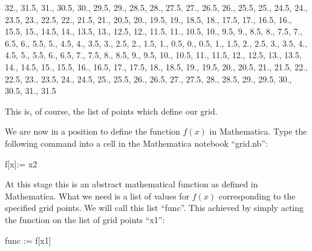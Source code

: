 \documentclass[letterpaper,10pt,english]{sphinxmanual}
\begin{document}
\begin{sphinxVerbatim}[commandchars=\\\{\}]
\PYGZob{}\PYGZhy{}32., \PYGZhy{}31.5, \PYGZhy{}31., \PYGZhy{}30.5, \PYGZhy{}30., \PYGZhy{}29.5, \PYGZhy{}29., \PYGZhy{}28.5, \PYGZhy{}28., \PYGZhy{}27.5,
\PYGZhy{}27., \PYGZhy{}26.5, \PYGZhy{}26., \PYGZhy{}25.5, \PYGZhy{}25., \PYGZhy{}24.5, \PYGZhy{}24., \PYGZhy{}23.5, \PYGZhy{}23., \PYGZhy{}22.5,
\PYGZhy{}22., \PYGZhy{}21.5, \PYGZhy{}21., \PYGZhy{}20.5, \PYGZhy{}20., \PYGZhy{}19.5, \PYGZhy{}19., \PYGZhy{}18.5, \PYGZhy{}18., \PYGZhy{}17.5,
\PYGZhy{}17., \PYGZhy{}16.5, \PYGZhy{}16., \PYGZhy{}15.5, \PYGZhy{}15., \PYGZhy{}14.5, \PYGZhy{}14., \PYGZhy{}13.5, \PYGZhy{}13., \PYGZhy{}12.5,
\PYGZhy{}12., \PYGZhy{}11.5, \PYGZhy{}11., \PYGZhy{}10.5, \PYGZhy{}10., \PYGZhy{}9.5, \PYGZhy{}9., \PYGZhy{}8.5, \PYGZhy{}8., \PYGZhy{}7.5, \PYGZhy{}7.,
\PYGZhy{}6.5, \PYGZhy{}6., \PYGZhy{}5.5, \PYGZhy{}5., \PYGZhy{}4.5, \PYGZhy{}4., \PYGZhy{}3.5, \PYGZhy{}3., \PYGZhy{}2.5, \PYGZhy{}2., \PYGZhy{}1.5, \PYGZhy{}1.,
\PYGZhy{}0.5, 0., 0.5, 1., 1.5, 2., 2.5, 3., 3.5, 4., 4.5, 5., 5.5, 6., 6.5,
7., 7.5, 8., 8.5, 9., 9.5, 10., 10.5, 11., 11.5, 12., 12.5, 13.,
13.5, 14., 14.5, 15., 15.5, 16., 16.5, 17., 17.5, 18., 18.5, 19.,
19.5, 20., 20.5, 21., 21.5, 22., 22.5, 23., 23.5, 24., 24.5, 25.,
25.5, 26., 26.5, 27., 27.5, 28., 28.5, 29., 29.5, 30., 30.5, 31.,
31.5\PYGZcb{}
\end{sphinxVerbatim}

\sphinxAtStartPar
This is, of course, the list of points which define our grid.

\sphinxAtStartPar
We are now in a position to define the function \(f(x)\) in Mathematica. Type the following command into a cell in the Mathematica notebook “grid.nb”:

\begin{sphinxVerbatim}[commandchars=\\\{\}]
f[x\PYGZus{}]:= x\PYGZca{}2
\end{sphinxVerbatim}

\sphinxAtStartPar
At this stage this is an abstract mathematical function as defined in Mathematica. What we need is a list of values for \(f(x)\) corresponding to the specified grid points. We will call this list “func”. This achieved by simply acting the function on the list of grid points “x1”:

\begin{sphinxVerbatim}[commandchars=\\\{\}]
func := f[x1]
\end{sphinxVerbatim}
\end{document}

